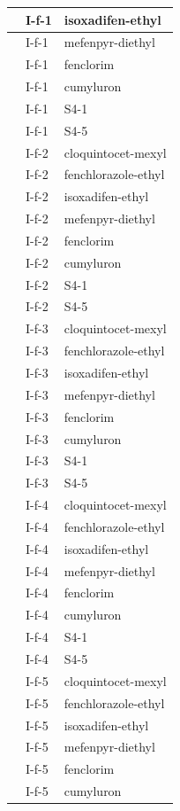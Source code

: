 \documentclass[11pt,a4paper]{article}
\begin{document}
\begin{table}[h]
\begin{tabular}{|l|l|l|}
 & I-f-1 & isoxadifen-ethyl \\ \hline
 & I-f-1 & mefenpyr-diethyl \\ \hline
 & I-f-1 & fenclorim \\ \hline
 & I-f-1 & cumyluron \\ \hline
 & I-f-1 & S4-1 \\ \hline
 & I-f-1 & S4-5 \\ \hline
 & I-f-2 & cloquintocet-mexyl \\ \hline
 & I-f-2 & fenchlorazole-ethyl \\ \hline
 & I-f-2 & isoxadifen-ethyl \\ \hline
 & I-f-2 & mefenpyr-diethyl \\ \hline
 & I-f-2 & fenclorim \\ \hline
 & I-f-2 & cumyluron \\ \hline
 & I-f-2 & S4-1 \\ \hline
 & I-f-2 & S4-5 \\ \hline
 & I-f-3 & cloquintocet-mexyl \\ \hline
 & I-f-3 & fenchlorazole-ethyl \\ \hline
 & I-f-3 & isoxadifen-ethyl \\ \hline
 & I-f-3 & mefenpyr-diethyl \\ \hline
 & I-f-3 & fenclorim \\ \hline
 & I-f-3 & cumyluron \\ \hline
 & I-f-3 & S4-1 \\ \hline
 & I-f-3 & S4-5 \\ \hline
 & I-f-4 & cloquintocet-mexyl \\ \hline
 & I-f-4 & fenchlorazole-ethyl \\ \hline
 & I-f-4 & isoxadifen-ethyl \\ \hline
 & I-f-4 & mefenpyr-diethyl \\ \hline
 & I-f-4 & fenclorim \\ \hline
 & I-f-4 & cumyluron \\ \hline
 & I-f-4 & S4-1 \\ \hline
 & I-f-4 & S4-5 \\ \hline
 & I-f-5 & cloquintocet-mexyl \\ \hline
 & I-f-5 & fenchlorazole-ethyl \\ \hline
 & I-f-5 & isoxadifen-ethyl \\ \hline
 & I-f-5 & mefenpyr-diethyl \\ \hline
 & I-f-5 & fenclorim \\ \hline
 & I-f-5 & cumyluron \\ \hline

\end{tabular}
\end{table}
\end{document}
